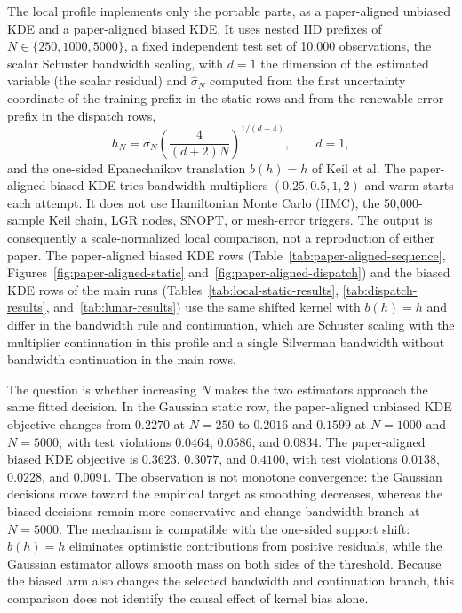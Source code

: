 The local profile implements only the portable parts, as a paper-aligned unbiased KDE and a paper-aligned biased KDE. It uses nested IID prefixes of $N\in\{250,1000,5000\}$, a fixed independent test set of 10,000 observations, the scalar Schuster bandwidth scaling, with $d=1$ the dimension of the estimated variable (the scalar residual) and $\hat\sigma_N$ computed from the first uncertainty coordinate of the training prefix in the static rows and from the renewable-error prefix in the dispatch rows,
\begin{equation}
 h_N=\hat\sigma_N\left(\frac{4}{(d+2)N}\right)^{1/(d+4)},
 \qquad d=1,
 \label{eq:schuster-local-bandwidth}
\end{equation}
and the one-sided Epanechnikov translation $b(h)=h$ of Keil et al. The paper-aligned biased KDE tries bandwidth multipliers $(0.25,0.5,1,2)$ and warm-starts each attempt. It does not use Hamiltonian Monte Carlo (HMC), the 50,000-sample Keil chain, LGR nodes, SNOPT, or mesh-error triggers. The output is consequently a scale-normalized local comparison, not a reproduction of either paper. The paper-aligned biased KDE rows (Table~\ref{tab:paper-aligned-sequence}, Figures~\ref{fig:paper-aligned-static} and~\ref{fig:paper-aligned-dispatch}) and the biased KDE rows of the main runs (Tables~\ref{tab:local-static-results}, \ref{tab:dispatch-results}, and~\ref{tab:lunar-results}) use the same shifted kernel with $b(h)=h$ and differ in the bandwidth rule and continuation, which are Schuster scaling with the multiplier continuation in this profile and a single Silverman bandwidth without bandwidth continuation in the main rows.

The question is whether increasing $N$ makes the two estimators approach the same fitted decision. In the Gaussian static row, the paper-aligned unbiased KDE objective changes from $0.2270$ at $N=250$ to $0.2016$ and $0.1599$ at $N=1000$ and $N=5000$, with test violations $0.0464$, $0.0586$, and $0.0834$. The paper-aligned biased KDE objective is $0.3623$, $0.3077$, and $0.4100$, with test violations $0.0138$, $0.0228$, and $0.0091$. The observation is not monotone convergence: the Gaussian decisions move toward the empirical target as smoothing decreases, whereas the biased decisions remain more conservative and change bandwidth branch at $N=5000$. The mechanism is compatible with the one-sided support shift: $b(h)=h$ eliminates optimistic contributions from positive residuals, while the Gaussian estimator allows smooth mass on both sides of the threshold. Because the biased arm also changes the selected bandwidth and continuation branch, this comparison does not identify the causal effect of kernel bias alone.

